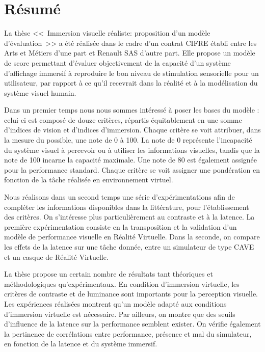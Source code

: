 \chapter*{Résumé}
\par La thèse <<~Immersion visuelle réaliste: proposition d'un modèle d'évaluation~>> a été réalisée dans le cadre d’un contrat CIFRE établi entre les Arts et Métiers d’une part et Renault SAS d’autre part. Elle propose un modèle de score permettant d’évaluer objectivement de la capacité d’un système d’affichage immersif à reproduire le bon niveau de stimulation sensorielle pour un utilisateur, par rapport à ce qu’il recevrait dans la réalité et à la modélisation du système visuel humain.

\par Dans un premier temps nous nous sommes intéressé à poser les bases du modèle : celui-ci est composé de douze critères, répartis équitablement en une somme d’indices de vision et d’indices d’immersion. Chaque critère se voit attribuer, dans la mesure du possible, une note de 0 à 100. La note de 0 représente l’incapacité du système visuel à percevoir ou à utiliser les informations visuelles, tandis que la note de 100 incarne la capacité maximale. Une note de 80 est également assignée pour la performance standard. Chaque critère se voit assigner une pondération en fonction de la tâche réalisée en environnement virtuel.

\par Nous réalisons dans un second temps une série d’expérimentations afin de compléter les informations disponibles dans la littérature, pour l’établissement des critères. On s’intéresse plus particulièrement au contraste et à la latence. La première expérimentation consiste en la transposition et la validation d’un modèle de performance visuelle en Réalité Virtuelle. Dans la seconde, on compare les effets de la latence sur une tâche donnée, entre un simulateur de type CAVE et un casque de Réalité Virtuelle.

\par La thèse propose un certain nombre de résultats tant théoriques et méthodologiques qu’expérimentaux. En condition d’immersion virtuelle, les critères de contraste et de luminance sont importants pour la perception visuelle. Les expériences réalisées montrent qu’un modèle adapté aux conditions d’immersion virtuelle est nécessaire. Par ailleurs, on montre que des seuils d’influence de la latence sur la performance semblent exister. On vérifie également la pertinence de corrélations entre performance, présence et mal du simulateur, en fonction de la latence et du système immersif.


